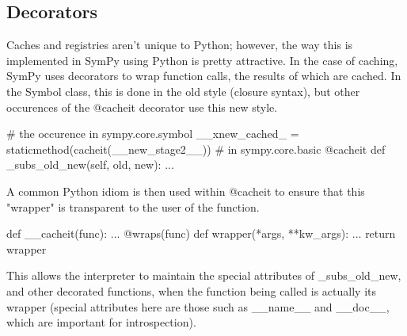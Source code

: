\documentclass[11pt,a4paper,oneside]{report}
\begin{document}
\subsection*{Decorators}
Caches and registries aren't unique to Python; however, the way this is implemented in SymPy using Python is pretty attractive. In the case of caching, SymPy uses decorators to wrap function calls, the results of which are cached. In the Symbol class, this is done in the old style (closure syntax), but other occurences of the @cacheit decorator use this new style. 
\begin{verbatimtab}
# the occurence in sympy.core.symbol
__xnew_cached_ = staticmethod(cacheit(__new_stage2__))
# in sympy.core.basic
@cacheit
def _subs_old_new(self, old, new):
	...
\end{verbatimtab}
A common Python idiom is then used within @cacheit to ensure that this "wrapper" is transparent to the user of the function.
\begin{verbatimtab}
def __cacheit(func):
	...
	@wraps(func)
    def wrapper(*args, **kw_args):
    	...
    return wrapper
\end{verbatimtab}
This allows the interpreter to maintain the special attributes of \_subs\_old\_new, and other decorated functions, when the function being called is actually its wrapper (special attributes here are those such as \_\_name\_\_ and \_\_doc\_\_, which are important for introspection).
\end{document}
